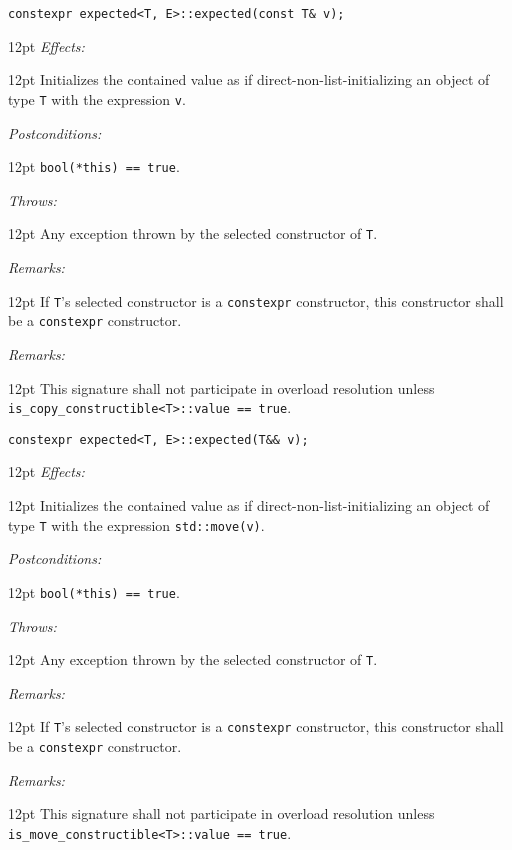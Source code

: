\documentclass[a4paper,10pt]{article}
\newcommand{\cpp}[1]{\lstinline{#1}}
\newcommand{\wordingItem}[1]{\noindent\textit{#1:}}
\newenvironment{wordingTextItem}[1]{\wordingItem{#1}\vspace{7pt}\noindent\begin{adjustwidth}{12pt}{}}{\vspace{7pt}\end{adjustwidth}}
\newenvironment{wordingPara}{\begin{adjustwidth}{12pt}{}}{\end{adjustwidth}}
\begin{document}
\begin{lstlisting}[xleftmargin=0pt]
constexpr expected<T, E>::expected(const T& v);
\end{lstlisting}
\begin{wordingPara}
\begin{wordingTextItem}{Effects}
Initializes the contained value as if direct-non-list-initializing an object of type \cpp{T} with the expression \cpp{v}.
\end{wordingTextItem}
\begin{wordingTextItem}{Postconditions}
\cpp{bool(*this) == true}.
\end{wordingTextItem}
\begin{wordingTextItem}{Throws}
Any exception thrown by the selected constructor of \cpp{T}.
\end{wordingTextItem}
\begin{wordingTextItem}{Remarks}
If \cpp{T}'s selected constructor is a \cpp{constexpr} constructor, this constructor shall be a \cpp{constexpr} constructor.
\end{wordingTextItem}
\begin{wordingTextItem}{Remarks}
This signature shall not participate in overload resolution unless\\
\cpp{is_copy_constructible<T>::value == true}. 
\end{wordingTextItem}
\end{wordingPara}

\begin{lstlisting}[xleftmargin=0pt]
constexpr expected<T, E>::expected(T&& v); 
\end{lstlisting}
\begin{wordingPara}
\begin{wordingTextItem}{Effects}
Initializes the contained value as if direct-non-list-initializing an object of type \cpp{T} with the expression \cpp{std::move(v)}.
\end{wordingTextItem}
\begin{wordingTextItem}{Postconditions}
\cpp{bool(*this) == true}.
\end{wordingTextItem}
\begin{wordingTextItem}{Throws}
Any exception thrown by the selected constructor of \cpp{T}.
\end{wordingTextItem}
\begin{wordingTextItem}{Remarks}
If \cpp{T}'s selected constructor is a \cpp{constexpr} constructor, this constructor shall be a \cpp{constexpr} constructor.
\end{wordingTextItem}
\begin{wordingTextItem}{Remarks}
This signature shall not participate in overload resolution unless\\
\cpp{is_move_constructible<T>::value == true}.
\end{wordingTextItem}
\end{wordingPara}
\end{document}
